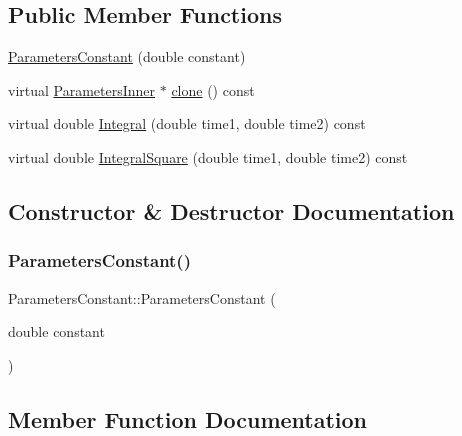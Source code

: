 \subsection*{Public Member Functions}
\begin{DoxyCompactItemize}
\item 
\hyperlink{classParametersConstant_a48e80f3805222a7c54952ef60f90f2dc}{Parameters\+Constant} (double constant)
\item 
virtual \hyperlink{classParametersInner}{Parameters\+Inner} $\ast$ \hyperlink{classParametersConstant_a8498b584b18a292e990c8eab5510763a}{clone} () const
\item 
virtual double \hyperlink{classParametersConstant_afeb3f63d392314a243a0156599ee3a42}{Integral} (double time1, double time2) const
\item 
virtual double \hyperlink{classParametersConstant_ad5c8d91b72338d7fca8efc71b956d32f}{Integral\+Square} (double time1, double time2) const
\end{DoxyCompactItemize}


\subsection{Constructor \& Destructor Documentation}
\hypertarget{classParametersConstant_a48e80f3805222a7c54952ef60f90f2dc}{}\label{classParametersConstant_a48e80f3805222a7c54952ef60f90f2dc} 
\subsubsection{\texorpdfstring{Parameters\+Constant()}{ParametersConstant()}}
{\footnotesize\ttfamily Parameters\+Constant\+::\+Parameters\+Constant (\begin{DoxyParamCaption}\item[{double}]{constant }\end{DoxyParamCaption})}



\subsection{Member Function Documentation}
\hypertarget{classParametersConstant_a8498b584b18a292e990c8eab5510763a}{}\label{classParametersConstant_a8498b584b18a292e990c8eab5510763a} 
